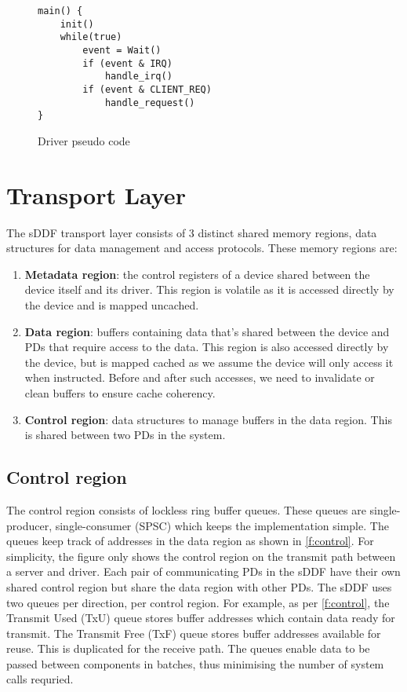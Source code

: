 \begin{figure} [H]
\begin{verbatim}
main() {
    init()
    while(true)
        event = Wait()
        if (event & IRQ)
            handle_irq()
        if (event & CLIENT_REQ)
            handle_request()
}
\end{verbatim}
\caption{Driver pseudo code}
\label{l:driver_pseudo}
\end{figure}

\section{Transport Layer}
The sDDF transport layer consists of 3 distinct shared memory regions, data structures for data management
and access protocols. These memory regions are:
\begin{enumerate}
    \item \textbf{Metadata region}: the control registers of a device shared between the device itself and its driver. 
    This region is volatile as it is accessed directly by the device and is mapped uncached. 
    \item \textbf{Data region}: buffers containing data that's shared between the device and PDs that require access to the data.
    This region is also accessed directly by the device, but is mapped cached as we assume the device will only access it when 
    instructed. Before and after such accesses, we need to invalidate or clean buffers to ensure cache coherency.
    \item \textbf{Control region}: data structures to manage buffers in the data region. This is shared between two PDs in the system. 
\end{enumerate}

\subsection{Control region}
The control region consists of lockless ring buffer queues. These queues are single-producer,
single-consumer (SPSC) which keeps the implementation simple.
The queues keep track of addresses in the data region as shown in \autoref{f:control}. For simplicity,
the figure only shows the control region on the transmit path between a server and driver. Each pair of 
communicating PDs in the sDDF have their own shared control region but share the data region with other PDs. 
The sDDF uses two queues per direction, per control region. For example, as per \autoref{f:control}, the 
Transmit Used (TxU) queue stores buffer addresses which contain data ready for transmit. 
The Transmit Free (TxF) queue stores buffer addresses available for reuse. This is duplicated for the receive path.
The queues enable data to be passed between components in batches, thus minimising the number of system calls requried. 

